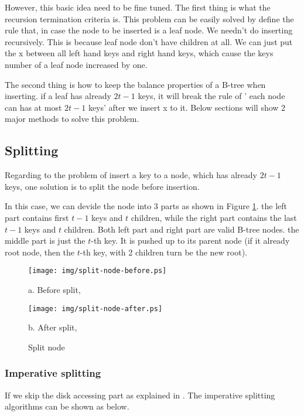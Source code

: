 \documentclass{article}
\begin{document}
However, this basic idea need to be fine tuned. The first thing is what
the recursion termination criteria is. This problem can be easily solved
by define the rule that, in case the node to be inserted is a leaf node.
We needn't do inserting recursively. This is because leaf node don't have
children at all. We can just put the x between all left hand keys and 
right hand keys, which cause the keys number of a leaf node increased by one.

The second thing is how to keep the balance properties of a B-tree when
inserting. if a leaf has already $2t-1$ keys, it will break the rule of '
each node can has at most $2t-1$ keys' after we insert x to it. Below
sections will show 2 major methods to solve this problem. 

\subsection{Splitting}
\label{split}
Regarding to the problem of insert a key to a node, which has already
$2t-1$ keys, one solution is to split the node before insertion.

In this case, we can devide the node into 3 parts as shown in 
Figure \ref{fig:node-split}. the left part contains first $t-1$ keys
and $t$ children, while the right part contains the last $t-1$ keys
and $t$ children. Both left part and right part are valid B-tree
nodes. the middle part is just the $t$-th key. It is pushed up
to its parent node (if it already root node, then the $t$-th key,
with 2 children turn be the new root).

\begin{figure}[htbp]
       \begin{center}
       	  \texttt{[image: img/split-node-before.ps]}

          a. Before split,

          \texttt{[image: img/split-node-after.ps]}

          b. After split, 
        \caption{Split node} \label{fig:node-split}
       \end{center}
\end{figure}

\subsubsection{Imperative splitting}
If we skip the disk accessing part as explained in \cite{CLRS}. The 
imperative splitting algorithms can be shown as below.
\end{document}
